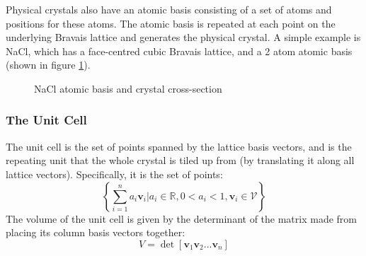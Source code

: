 \documentclass[12pt]{article}
\begin{document}
Physical crystals also have an atomic basis consisting of a set of atoms and positions for these atoms. The atomic basis is repeated at each point on the underlying Bravais lattice and generates the physical crystal. 
A simple example is NaCl, which has a face-centred cubic Bravais lattice, and a 2 atom atomic basis (shown in figure \ref{fig:nacl_lattice}).
\begin{figure}[t!]
    \centering
    \qquad
    \qquad
    \caption{NaCl atomic basis and crystal cross-section}
\label{fig:nacl_lattice}
\end{figure}
\subsubsection{The Unit Cell}
The unit cell is the set of points spanned by the lattice basis vectors, and is the repeating unit that the whole crystal is tiled up from (by translating it along all lattice vectors). Specifically, it is the set of points:
\begin{equation}\label{eq:unit_cell}
	\left\{\sum _{i=1}^n a_i \mathbf v_i \Big| a_i \in \mathbb{R}, 0<a_i<1, \mathbf{v}_i \in \mathcal V \right\}
\end{equation}
The volume of the unit cell is given by the determinant of the matrix made from placing its column basis vectors together:
\begin{equation}
	V = \det [\mathbf{v}_1 \mathbf{v}_2 ... \mathbf{v}_n]
\end{equation}
\end{document}
